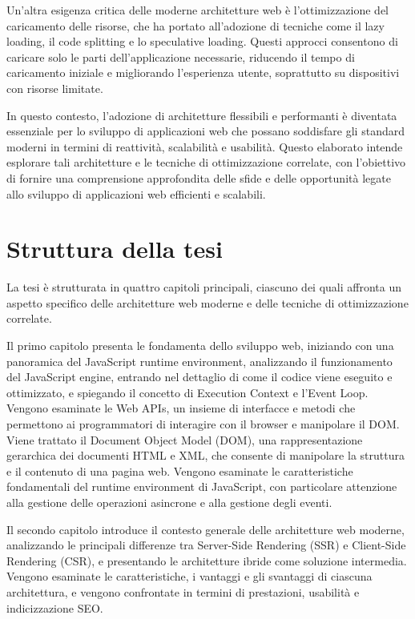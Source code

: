 Un'altra esigenza critica delle moderne architetture web è l'ottimizzazione del caricamento delle risorse, che ha
portato all'adozione di tecniche come il lazy loading, il code splitting e lo speculative loading. Questi approcci consentono di caricare solo
le parti dell'applicazione necessarie, riducendo il tempo di caricamento iniziale e migliorando l'esperienza utente,
soprattutto su dispositivi con risorse limitate.

In questo contesto, l'adozione di architetture flessibili e performanti è diventata essenziale per lo sviluppo di
applicazioni web che possano soddisfare gli standard moderni in termini di reattività, scalabilità e usabilità. Questo
elaborato intende esplorare tali architetture e le tecniche di ottimizzazione correlate, con l'obiettivo di fornire una
comprensione approfondita delle sfide e delle opportunità legate allo sviluppo di applicazioni web efficienti e
scalabili.

\section*{Struttura della tesi}
La tesi è strutturata in quattro capitoli principali, ciascuno dei quali affronta un aspetto specifico delle
architetture web moderne e delle tecniche di ottimizzazione correlate.

Il primo capitolo presenta le fondamenta dello sviluppo web, iniziando con una panoramica del JavaScript runtime
environment, analizzando il funzionamento del JavaScript engine, entrando nel dettaglio di come il codice viene eseguito
e ottimizzato, e spiegando il concetto di Execution Context e l'Event Loop. 
Vengono esaminate le Web APIs, un insieme di interfacce e metodi che permettono ai programmatori di interagire con il
browser e manipolare il DOM. Viene trattato il Document Object Model (DOM), una rappresentazione gerarchica dei
documenti HTML e XML, che consente di manipolare la struttura e il contenuto di una pagina web.
Vengono esaminate le caratteristiche fondamentali del runtime environment di JavaScript, con particolare attenzione alla gestione delle operazioni asincrone e alla gestione degli eventi.

Il secondo capitolo introduce il contesto generale delle architetture web moderne, analizzando le principali differenze tra Server-Side Rendering (SSR) e Client-Side Rendering (CSR), e presentando le architetture ibride come soluzione
intermedia. Vengono esaminate le caratteristiche, i vantaggi e gli svantaggi di ciascuna architettura, e vengono confrontate in termini di prestazioni, usabilità e indicizzazione SEO.

